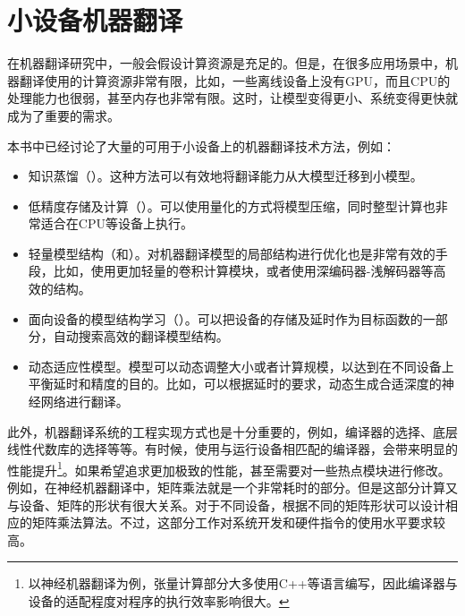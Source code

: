 
\section{小设备机器翻译}

\parinterval 在机器翻译研究中，一般会假设计算资源是充足的。但是，在很多应用场景中，机器翻译使用的计算资源非常有限，比如，一些离线设备上没有GPU，而且CPU的处理能力也很弱，甚至内存也非常有限。这时，让模型变得更小、系统变得更快就成为了重要的需求。

\parinterval 本书中已经讨论了大量的可用于小设备上的机器翻译技术方法，例如：

\begin{itemize}
\vspace{0.5em}
\item 知识蒸馏（{\chapterthirteen}）。这种方法可以有效地将翻译能力从大模型迁移到小模型。

\vspace{0.5em}
\item 低精度存储及计算（{\chapterfourteen}）。可以使用量化的方式将模型压缩，同时整型计算也非常适合在CPU等设备上执行。

\vspace{0.5em}
\item 轻量模型结构（{\chapterfourteen}和{\chapterfifteen}）。对机器翻译模型的局部结构进行优化也是非常有效的手段，比如，使用更加轻量的卷积计算模块，或者使用深编码器-浅解码器等高效的结构。

\vspace{0.5em}
\item 面向设备的模型结构学习（{\chapterfifteen}）。可以把设备的存储及延时作为目标函数的一部分，自动搜索高效的翻译模型结构。

\vspace{0.5em}
\item 动态适应性模型。模型可以动态调整大小或者计算规模，以达到在不同设备上平衡延时和精度的目的。比如，可以根据延时的要求，动态生成合适深度的神经网络进行翻译。

\vspace{0.5em}
\end{itemize}

\parinterval 此外，机器翻译系统的工程实现方式也是十分重要的，例如，编译器的选择、底层线性代数库的选择等等。有时候，使用与运行设备相匹配的编译器，会带来明显的性能提升\footnote{以神经机器翻译为例，张量计算部分大多使用C++等语言编写，因此编译器与设备的适配程度对程序的执行效率影响很大。}。如果希望追求更加极致的性能，甚至需要对一些热点模块进行修改。例如，在神经机器翻译中，矩阵乘法就是一个非常耗时的部分。但是这部分计算又与设备、矩阵的形状有很大关系。对于不同设备，根据不同的矩阵形状可以设计相应的矩阵乘法算法。不过，这部分工作对系统开发和硬件指令的使用水平要求较高。

